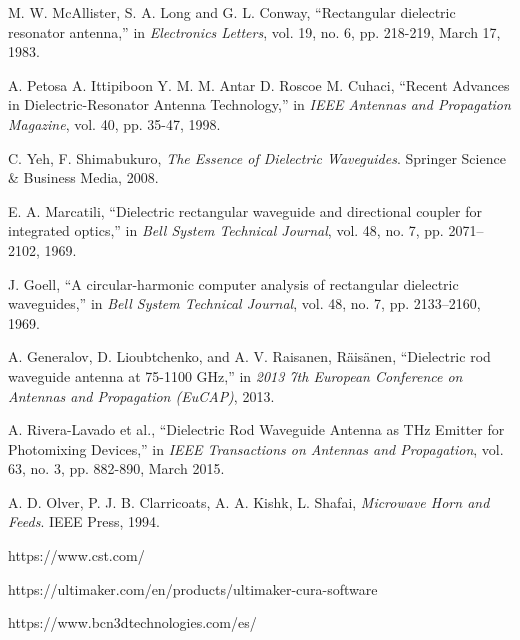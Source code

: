 \documentclass{IEEEtran}
\begin{document}
\begin{thebibliography}{00}
 M. W. McAllister, S. A. Long and G. L. Conway, ``Rectangular dielectric resonator antenna,'' in \emph{Electronics Letters}, vol. 19, no. 6, pp. 218-219, March 17, 1983.

 A. Petosa A. Ittipiboon Y. M. M. Antar D. Roscoe M. Cuhaci, ``Recent Advances in Dielectric-Resonator Antenna Technology,'' in \emph{IEEE Antennas and Propagation Magazine}, vol. 40, pp. 35-47, 1998. 

 C. Yeh, F. Shimabukuro, \emph{The Essence of Dielectric Waveguides}. Springer Science \& Business Media, 2008.

 E. A. Marcatili, ``Dielectric rectangular waveguide and directional coupler for integrated optics,'' in \emph{Bell System Technical Journal}, vol. 48, no. 7, pp. 2071–2102, 1969.

 J. Goell, ``A circular-harmonic computer analysis of rectangular dielectric waveguides,'' in \emph{Bell System Technical Journal}, vol. 48, no. 7, pp. 2133–2160, 1969.

 A. Generalov, D. Lioubtchenko, and A. V. Raisanen, Räisänen, ``Dielectric rod waveguide antenna at 75-1100 GHz,'' in \emph{2013 7th European Conference on Antennas and Propagation (EuCAP)}, 2013.

A. Rivera-Lavado et al., ``Dielectric Rod Waveguide Antenna as THz Emitter for Photomixing Devices,'' in \emph{IEEE Transactions on Antennas and Propagation}, vol. 63, no. 3, pp. 882-890, March 2015.

 A. D. Olver, P. J. B. Clarricoats, A. A. Kishk, L. Shafai, \emph{Microwave Horn and Feeds}. IEEE Press, 1994.

 https://www.cst.com/

 https://ultimaker.com/en/products/ultimaker-cura-software

 https://www.bcn3dtechnologies.com/es/

\end{thebibliography}
\end{document}
